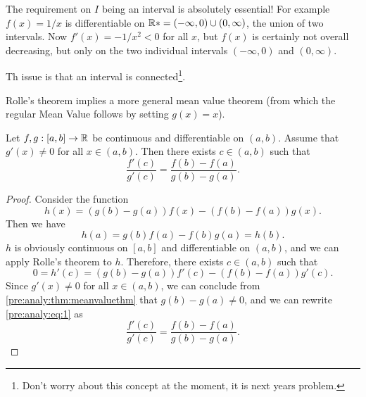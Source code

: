 \documentclass[10pt, a4paper]{article}
\begin{document}
The requirement on $I$ being an interval is absolutely essential!
For example $f(x) = 1 /x$ is differentiable on $\mathbb{R}* = (-\infty, 0) \cup (0, \infty)$,
the union of two intervals.
Now $f'(x) = -1 / x ^ 2 < 0$ for all $x$,
but $f(x)$ is certainly not overall decreasing,
but only on the two individual intervals $(-\infty, 0)$ and $(0, \infty)$.

Th issue is that an interval is connected\footnote{Don't worry about this concept at the moment,
it is next years problem.}.

Rolle's theorem implies a more general mean value theorem
(from which the regular Mean Value follows by setting $g(x) = x$).

\begin{theorem}\label{pre:analy:thm:genmeanvalthm}
    Let $f, g : [a, b] \rightarrow \mathbb{R}$ be continuous and differentiable on $(a, b)$.
    Assume that $g'(x) \neq 0$ for all $x \in (a, b)$.
    Then there exists $c \in (a, b)$ such that
    \[
    \frac{f'(c)}{g'(c)} = \frac{f(b) - f(a)}{g(b) - g(a)}.
    \]
    \begin{center}
    \end{center}
    \hfill
    \begin{proof}
        Consider the function
        \[
        h(x) = (g(b) - g(a))f(x) - (f(b) - f(a))g(x).
        \]
        Then we have
        \[
        h(a) = g(b)f(a) - f(b)g(a) = h(b).
        \]
        $h$ is obviously continuous on $[a, b]$ and differentiable on $(a, b)$,
        and we can apply Rolle's theorem to $h$.
        Therefore,
        there exists $c \in (a, b)$ such that
        \begin{equation}\label{pre:analy:eq:1}
            0 = h'(c) = (g(b) - g(a))f'(c) - (f(b) - f(a))g'(c).
        \end{equation}
        Since $g'(x) \neq 0$ for all $x \in (a, b)$,
        we can conclude from \autoref{pre:analy:thm:meanvaluethm} that $g(b) - g(a) \neq 0$,
        and we can rewrite \eqref{pre:analy:eq:1} as
        \[
        \frac{f'(c)}{g'(c)} = \frac{f(b) - f(a)}{g(b) - g(a)}.
        \]
    \end{proof}
\end{theorem}
\end{document}
